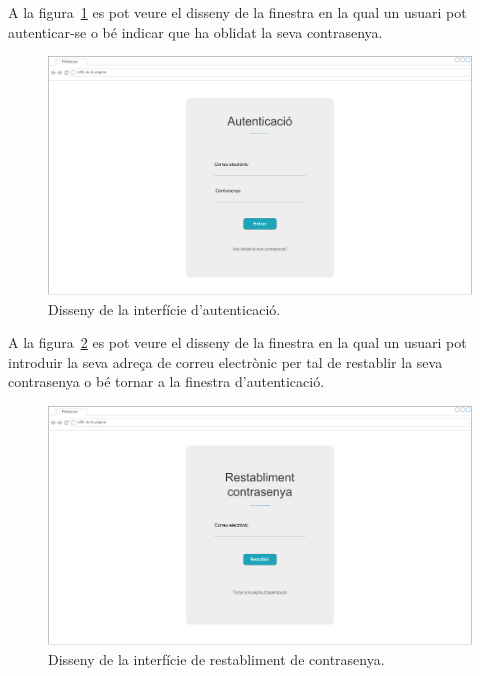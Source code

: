 \documentclass[a4paper,12pt]{ThesisStyle}
\begin{document}
A la figura~\ref{img:login} es pot veure el disseny de la finestra en la qual un usuari pot autenticar-se o bé indicar que ha oblidat la seva contrasenya.
\begin{figure}[H]
	\centering
	\includegraphics[width=\textwidth]{assets/interfaces/auth/login.pdf}
	\caption{\label{img:login}Disseny de la interfície d'autenticació.}
\end{figure}

A la figura~\ref{img:passwordRestablishment} es pot veure el disseny de la finestra en la qual un usuari pot introduir la seva adreça de correu electrònic per tal de restablir la seva contrasenya o bé tornar a la finestra d'autenticació.
\begin{figure}[H]
	\centering
	\includegraphics[width=\textwidth]{assets/interfaces/auth/passwordRestablishment.pdf}
	\caption{\label{img:passwordRestablishment}Disseny de la interfície de restabliment de contrasenya.}
\end{figure}
\end{document}
